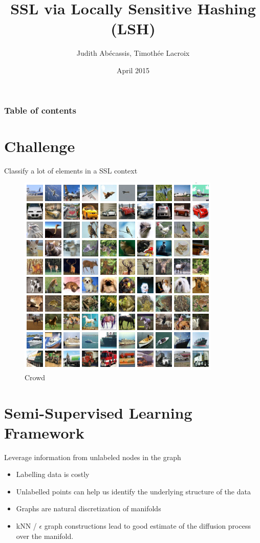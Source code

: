 \documentclass[11pt)]{beamer}
\author{Judith Abécassis, Timothée Lacroix}
\title{SSL via Locally Sensitive Hashing (LSH)}
\institute{Graphs in Machine Learning}
\date{April 2015}
\begin{document}
\graphicspath{{./../report/figures/}}
\begin{frame}
\titlepage
\end{frame}

{
  \begin{frame}
    \frametitle{Table of contents}
    \tableofcontents[currentsection]
  \end{frame}
}


\section{Challenge}
\begin{frame}{Classify a lot of elements in a SSL context}
  \begin{figure}
    \centering
    \includegraphics[width=\textwidth]{cifar-10.png}
    \caption{Crowd}
  \end{figure}
\end{frame}

\section{Semi-Supervised Learning Framework}
\begin{frame}{Leverage information from unlabeled nodes in the graph}
\begin{itemize}
 \item Labelling data is costly
 \item Unlabelled points can help us identify the underlying structure of the data
 \item Graphs are natural discretization of manifolds
 \item kNN / $\epsilon$ graph constructions lead to good estimate of the diffusion process over the manifold.
\end{itemize}
\end{frame}
\end{document}
